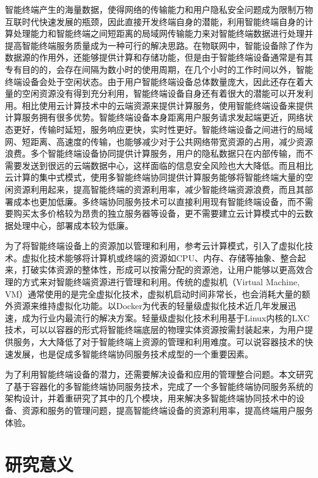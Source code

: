 智能终端产生的海量数据，使得网络的传输能力和用户隐私安全问题成为限制万物互联时代快速发展的瓶颈，因此直接开发终端自身的潜能\citep{王劲林2015一种现场}，利用智能终端自身的计算处理能力和智能终端之间短距离的局域网传输能力来对智能终端数据进行处理并提高智能终端服务质量成为一种可行的解决思路。在物联网中，智能设备除了作为数据源的作用外，还能够提供计算和存储功能，但是由于智能终端设备通常是有其专有目的的，会存在间隔为数小时的使用周期，在几个小时的工作时间以外，智能终端设备会处于空闲状态\citep{renner2016towards}。由于用户智能终端设备总体数量庞大，因此还存在着大量的空闲资源没有得到充分利用，智能终端设备自身还有着很大的潜能可以开发利用。相比使用云计算技术中的云端资源来提供计算服务，使用智能终端设备来提供计算服务拥有很多优势。智能终端设备本身距离用户服务请求发起端更近，网络状态更好，传输时延短，服务响应更快，实时性更好。智能终端设备之间进行的局域网、短距离、高速度的传输，也能够减少对于公共网络带宽资源的占用，减少资源浪费。多个智能终端设备协同提供计算服务，用户的隐私数据只在内部传输，而不需要发送到很远的云端数据中心，这样面临的信息安全风险也大大降低。而且相比云计算的集中式模式，使用多智能终端协同提供计算服务能够将智能终端大量的空闲资源利用起来，提高智能终端的资源利用率，减少智能终端资源浪费，而且其部署成本也更加低廉。多终端协同服务技术可以直接利用现有智能终端设备，而不需要购买太多价格较为昂贵的独立服务器等设备，更不需要建立云计算模式中的云数据处理中心，部署成本较为低廉。

为了将智能终端设备上的资源加以管理和利用，参考云计算模式，引入了虚拟化技术。虚拟化技术能够将计算机或终端的资源如CPU、内存、存储等抽象、整合起来，打破实体资源的整体性，形成可以按需分配的资源池，让用户能够以更高效合理的方式来对智能终端资源进行管理和利用。传统的虚拟机（Virtual Machine, VM）通常使用的是完全虚拟化技术，虚拟机启动时间非常长，也会消耗大量的额外资源来维持虚拟化功能。以Docker为代表的轻量级虚拟化技术近几年发展迅速，成为行业内最流行的解决方案。轻量级虚拟化技术利用基于Linux内核的LXC技术，可以以容器的形式将智能终端底层的物理实体资源按需封装起来，为用户提供服务，大大降低了对于智能终端上资源的管理和利用难度。可以说容器技术的快速发展，也是促成多智能终端协同服务技术成型的一个重要因素。

为了利用智能终端设备的潜力，还需要解决设备和应用的管理整合问题\citep{morabito2017evaluating}。本文研究了基于容器化的多智能终端协同服务技术，完成了一个多智能终端协同服务系统的架构设计，并着重研究了其中的几个模块，用来解决多智能终端协同技术中的设备、资源和服务的管理问题，提高智能终端设备的资源利用率，提高终端用户服务体验。



\section{研究意义}

